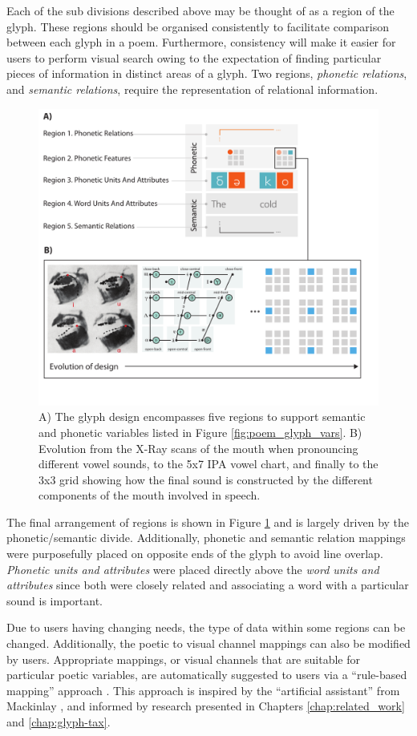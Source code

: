Each of the sub divisions described above may be thought of as a region of the glyph.
These regions should be organised consistently to facilitate comparison between each glyph in a poem.
Furthermore, consistency will make it easier for users to perform visual search owing to the expectation of finding particular pieces of information in distinct areas of a glyph.
Two regions, \emph{phonetic relations}, and \emph{semantic relations}, require the representation of relational information.

\begin{figure}[b!]
\centering
\includegraphics[width=.75\textwidth]{images/other_glyphs/poem_glyph_design}
\caption{A) The glyph design encompasses five regions to support semantic and phonetic variables listed in Figure \ref{fig:poem_glyph_vars}.
B) Evolution from the X-Ray scans of the mouth when pronouncing different vowel sounds, to the 5x7 IPA vowel chart, and finally to the 3x3 grid showing how the final sound is constructed by the different components of the mouth involved in speech.}
\label{fig:poem_glyph_design}
\end{figure}

The final arrangement of regions is shown in Figure \ref{fig:poem_glyph_design} and is largely driven by the phonetic/semantic divide.
Additionally, phonetic and semantic relation mappings were purposefully placed on opposite ends of the glyph to avoid line overlap. 
\emph{Phonetic units and attributes} were placed directly above the \emph{word units and attributes} since both were closely related and associating a word with a particular sound is important.
 
Due to users having changing needs, the type of data within some regions can be changed.
Additionally, the poetic to visual channel mappings can also be modified by users.
Appropriate mappings, or visual channels that are suitable for particular poetic variables, are automatically suggested to users via a ``rule-based mapping''  approach \cite{CGF:Abd2013a}.
This approach is inspired by the ``artificial assistant'' from Mackinlay \etal \cite{mackinlay2007show}, and informed by research presented in Chapters \ref{chap:related_work} and \ref{chap:glyph-tax}.


